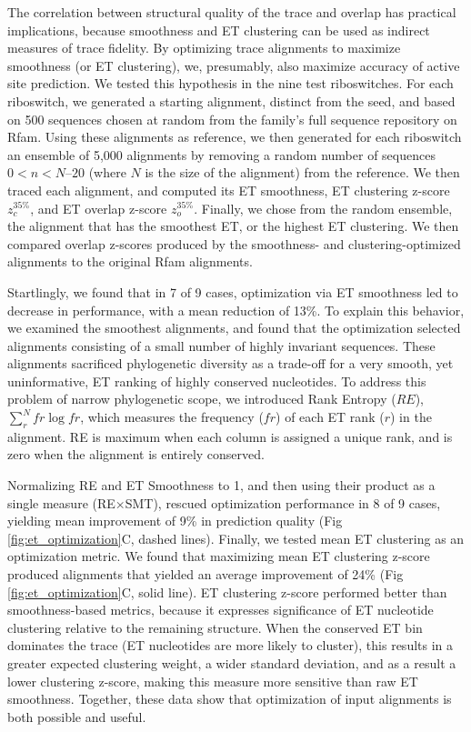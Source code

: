 \documentclass[12pt,a4paper]{report}
\begin{document}
The correlation between structural quality of the trace and overlap has practical implications, because smoothness and ET clustering can be used as indirect measures of trace fidelity. By optimizing trace alignments to maximize smoothness (or ET clustering), we, presumably, also maximize accuracy of active site prediction. We tested this hypothesis in the nine test riboswitches. For each riboswitch, we generated a starting alignment, distinct from the seed, and based on 500 sequences chosen at random from the family’s full sequence repository on Rfam. Using these alignments as reference, we then generated for each riboswitch an ensemble of 5,000 alignments by removing a random number of sequences $0< n< N–20$ (where $N$ is the size of the alignment) from the reference. We then traced each alignment, and computed its ET smoothness, ET clustering z-score $z_{c}^{35\%}$, and ET overlap z-score $z_{o}^{35\%}$. Finally, we chose from the random ensemble, the alignment that has the smoothest ET, or the highest ET clustering. We then compared overlap z-scores produced by the smoothness- and clustering-optimized alignments to the original Rfam alignments.

Startlingly, we found that in 7 of 9 cases, optimization via ET smoothness led to decrease in performance, with a mean reduction of 13\%. To explain this behavior, we examined the smoothest alignments, and found that the optimization selected alignments consisting of a small number of highly invariant sequences. These alignments sacrificed phylogenetic diversity as a trade-off for a very smooth, yet uninformative, ET ranking of highly conserved nucleotides. To address this problem of narrow phylogenetic scope, we introduced Rank Entropy ($RE$), $\sum_{r}^{N} fr \log fr$, which measures the frequency ($fr$) of each ET rank ($r$) in the alignment. RE is maximum when each column is assigned a unique rank, and is zero when the alignment is entirely conserved.

Normalizing RE and ET Smoothness to 1, and then using their product as a single measure (RE×SMT), rescued optimization performance in 8 of 9 cases, yielding mean improvement of 9\% in prediction quality (Fig \ref{fig:et_optimization}C, dashed lines). Finally, we tested mean ET clustering as an optimization metric. We found that maximizing mean ET clustering z-score produced alignments that yielded an average improvement of 24\% (Fig \ref{fig:et_optimization}C, solid line). ET clustering z-score performed better than smoothness-based metrics, because it expresses significance of ET nucleotide clustering relative to the remaining structure. When the conserved ET bin dominates the trace (ET nucleotides are more likely to cluster), this results in a greater expected clustering weight, a wider standard deviation, and as a result a lower clustering z-score, making this measure more sensitive than raw ET smoothness. Together, these data show that optimization of input alignments is both possible and useful.
\end{document}

